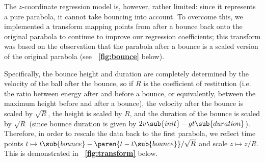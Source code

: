 \documentclass[letterpaper, 11pt]{article}
\newcommand*{\figref}[1]{\textbf{\figurename~\ref{#1}}}
\begin{document}
The $z$-coordinate regression model is, however, rather limited: since it represents a pure parabola, it cannot take bouncing into account. To overcome this, we implemented a transform mapping points from after a bounce back onto the original parabola to continue to improve our regression coefficients; this transform was based on the observation that the parabola after a bounce is a scaled version of the original parabola (see \figref{fig:bounce} below).

Specifically, the bounce height and duration are completely determined by the velocity of the ball after the bounce, so if $R$ is the coefficient of restitution (i.e. the ratio between energy after and before a bounce, or equivalently, between the maximum height before and after a bounce), the velocity after the bounce is scaled by $\sqrt{R}$, the height is scaled by $R$, and the duration of the bounce is scaled by $\sqrt{R}$ (since bounce duration is given by $2v\sub{init} - gt\sub{duration}$). Therefore, in order to rescale the data back to the first parabola, we reflect time points $t \mapsto t\sub{bounce} - \paren{t - t\sub{bounce}} / \sqrt{R}$ and scale $z \mapsto z / R$. This is demonstrated in \figref{fig:transform} below.
\end{document}
